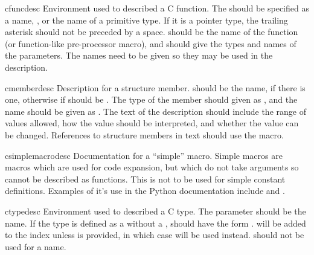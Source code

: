 \documentclass{howto}
\begin{document}
    \begin{envdesc}{cfuncdesc}{}
      Environment used to described a C function.  The 
      should be specified as a  name, , or the name of a primitive type.  If it is a pointer
      type, the trailing asterisk should not be preceded by a space.
       should be the name of the function (or function-like
      pre-processor macro), and  should give the types and
      names of the parameters.  The names need to be given so they may
      be used in the description.
    \end{envdesc}

    \begin{envdesc}{cmemberdesc}{}
      Description for a structure member.   should be
      the  name, if there is one, otherwise if should
      be .  The type of the member should given
      as , and the name should be given as .  The
      text of the description should include the range of values
      allowed, how the value should be interpreted, and whether the
      value can be changed.  References to structure members in text
      should use the  macro.
    \end{envdesc}

    \begin{envdesc}{csimplemacrodesc}{}
      Documentation for a ``simple'' macro.  Simple macros are macros
      which are used for code expansion, but which do not take
      arguments so cannot be described as functions.  This is not to
      be used for simple constant definitions.  Examples of it's use
      in the Python documentation include
       and
      .
    \end{envdesc}

    \begin{envdesc}{ctypedesc}{}
      Environment used to described a C type.  The 
      parameter should be the  name.  If the type is
      defined as a  without a ,
       should have the form .
       will be added to the index unless  is
      provided, in which case  will be used instead.
       should not be used for a  name.
    \end{envdesc}
\end{document}
